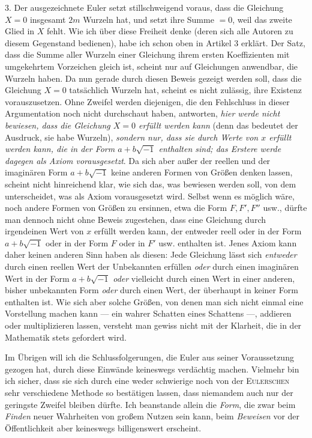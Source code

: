 3. Der ausgezeichnete Euler setzt stillschweigend voraus, dass die Gleichung $X=0$ insgesamt $2m$ Wurzeln hat, und setzt ihre Summe $=0$, weil das zweite Glied in $X$ fehlt. Wie ich über diese Freiheit denke (deren sich alle Autoren zu diesem Gegenstand bedienen), habe ich schon oben in Artikel 3 erklärt. Der Satz, dass die Summe aller Wurzeln einer Gleichung ihrem ersten Koeffizienten mit umgekehrtem Vorzeichen gleich ist, scheint nur auf Gleichungen anwendbar, die Wurzeln haben. Da nun gerade durch diesen Beweis gezeigt werden soll, dass die Gleichung $X=0$ tatsächlich Wurzeln hat, scheint es nicht zulässig, ihre Existenz vorauszusetzen. Ohne Zweifel werden diejenigen, die den Fehlschluss in dieser Argumentation noch nicht durchschaut haben, antworten, \textit{hier werde nicht bewiesen, dass die Gleichung $X=0$ erfüllt werden kann} (denn das bedeutet der Ausdruck, sie habe Wurzeln), \textit{sondern nur, dass sie durch Werte von $x$ erfüllt werden kann, die in der Form $a+b\sqrt{-1}$ enthalten sind; das Erstere werde dagegen als Axiom vorausgesetzt}. Da sich aber außer der reellen und der imaginären Form $a+b\sqrt{-1}$ keine anderen Formen von Größen denken lassen, scheint nicht hinreichend klar, wie sich das, was bewiesen werden soll, von dem unterscheidet, was als Axiom vorausgesetzt wird. Selbst wenn es möglich wäre, noch andere Formen von Größen zu ersinnen, etwa die Form $F,F',F''$ usw., dürfte man dennoch nicht ohne Beweis zugestehen, dass eine Gleichung durch irgendeinen Wert von $x$ erfüllt werden kann, der entweder reell oder in der Form $a+b\sqrt{-1}$ oder in der Form $F$ oder in $F'$ usw. enthalten ist. Jenes Axiom kann daher keinen anderen Sinn haben als diesen: Jede Gleichung lässt sich \textit{entweder} durch einen reellen Wert der Unbekannten erfüllen \textit{oder} durch einen imaginären Wert in der Form $a+b\sqrt{-1}$ \textit{oder} vielleicht durch einen Wert in einer anderen, bisher unbekannten Form \textit{oder} durch einen Wert, der überhaupt in keiner Form enthalten ist. Wie sich aber solche Größen, von denen man sich nicht einmal eine Vorstellung machen kann --- ein wahrer Schatten eines Schattens ---, addieren oder multiplizieren lassen, versteht man gewiss nicht mit der Klarheit, die in der Mathematik stets gefordert wird.

Im Übrigen will ich die Schlussfolgerungen, die Euler aus seiner Voraussetzung gezogen hat, durch diese Einwände keineswegs verdächtig machen. Vielmehr bin ich sicher, dass sie sich durch eine weder schwierige noch von der \textsc{Eulerschen} sehr verschiedene Methode so bestätigen lassen, dass niemandem auch nur der geringste Zweifel bleiben dürfte. Ich beanstande allein die \textit{Form}, die zwar beim \textit{Finden} neuer Wahrheiten von großem Nutzen sein kann, beim \textit{Beweisen} vor der Öffentlichkeit aber keineswegs billigenswert erscheint.

